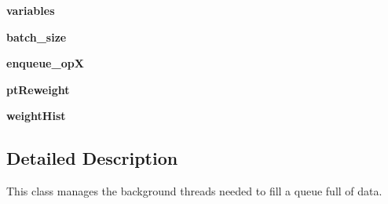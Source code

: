 \begin{DoxyCompactItemize}
\item 
\hypertarget{classCustomQueueRunner_1_1CustomQueueRunner_aa7bb789d918609955e2d755812855b33}{{\bfseries variables}}\label{classCustomQueueRunner_1_1CustomQueueRunner_aa7bb789d918609955e2d755812855b33}

\item 
\hypertarget{classCustomQueueRunner_1_1CustomQueueRunner_aed125859f24c11af006847d8c6613ca3}{{\bfseries batch\-\_\-size}}\label{classCustomQueueRunner_1_1CustomQueueRunner_aed125859f24c11af006847d8c6613ca3}

\item 
\hypertarget{classCustomQueueRunner_1_1CustomQueueRunner_a87afd27e4fba7b890ef7cf7056dd01be}{{\bfseries enqueue\-\_\-op\-X}}\label{classCustomQueueRunner_1_1CustomQueueRunner_a87afd27e4fba7b890ef7cf7056dd01be}

\item 
\hypertarget{classCustomQueueRunner_1_1CustomQueueRunner_aba53122c1cf237949531b1c016628c76}{{\bfseries pt\-Reweight}}\label{classCustomQueueRunner_1_1CustomQueueRunner_aba53122c1cf237949531b1c016628c76}

\item 
\hypertarget{classCustomQueueRunner_1_1CustomQueueRunner_a42ba75530a6b02c899654e679bf8ce87}{{\bfseries weight\-Hist}}\label{classCustomQueueRunner_1_1CustomQueueRunner_a42ba75530a6b02c899654e679bf8ce87}

\end{DoxyCompactItemize}


\subsection{Detailed Description}
\begin{DoxyVerb}This class manages the background threads needed to fill
    a queue full of data.
\end{DoxyVerb}
 

